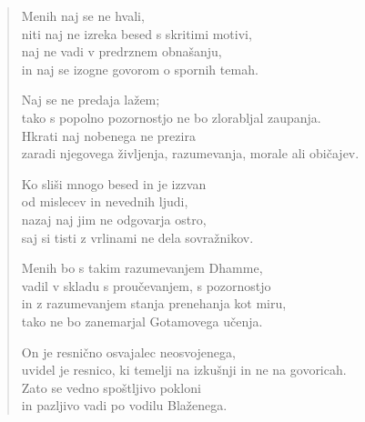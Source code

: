 \begin{verse}
Menih naj se ne hvali,\\
niti naj ne izreka besed s skritimi motivi,\\
naj ne vadi v predrznem obnašanju,\\
in naj se izogne govorom o spornih temah.

Naj se ne predaja lažem;\\
tako s popolno pozornostjo ne bo zlorabljal zaupanja.\\
Hkrati naj nobenega ne prezira\\
zaradi njegovega življenja, razumevanja, morale ali običajev.

Ko sliši mnogo besed in je izzvan\\
od mislecev in nevednih ljudi,\\
nazaj naj jim ne odgovarja ostro,\\
saj si tisti z vrlinami ne dela sovražnikov.

Menih bo s takim razumevanjem Dhamme,\\
vadil v skladu s proučevanjem, s pozornostjo\\
in z razumevanjem stanja prenehanja kot miru,\\
tako ne bo zanemarjal Gotamovega učenja.

On je resnično osvajalec neosvojenega,\\
uvidel je resnico, ki temelji na izkušnji in ne na govoricah.\\
Zato se vedno spoštljivo pokloni\\
in pazljivo vadi po vodilu Blaženega.


\end{verse}


\clearpage
\begin{verse}


\end{verse}


\clearpage
\begin{verse}


\end{verse}

